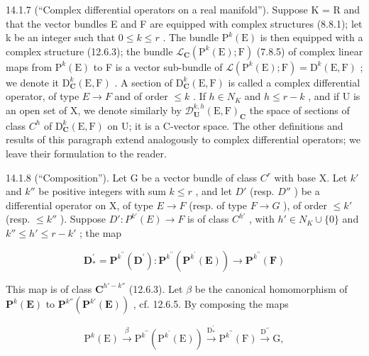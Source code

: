 14.1.7 (“Complex differential operators on a real manifold”). Suppose K = R and that the vector bundles E and F are equipped with complex structures (8.8.1); let k be an integer such that \(0 \leqslant k \leqslant r\) . The bundle \(\mathrm{P}^{k}(\mathrm{E})\) is then equipped with a complex structure (12.6.3); the bundle \(\mathcal{L}_{\mathbf{C}}(\mathrm{P}^{k}(\mathrm{E}); \mathrm{F})\) (7.8.5) of complex linear maps from \(\mathrm{P}^{k}(\mathrm{E})\) to F is a vector sub-bundle of \(\mathcal{L}(\mathrm{P}^{k}(\mathrm{E}); \mathrm{F}) = \mathrm{D}^{k}(\mathrm{E}, \mathrm{F})\) ; we denote it \(\mathrm{D}_{\mathbf{C}}^{k}(\mathrm{E}, \mathrm{F})\) . A section of \(\mathrm{D}_{\mathbf{C}}^{k}(\mathrm{E}, \mathrm{F})\) is called a complex differential operator, of type \(E \to F\) and of order \(\leqslant k\) . If \(h \in N_{K}\) and \(h \leqslant r - k\) , and if U is an open set of X, we denote similarly by \(\mathcal{D}_{\mathbf{U}}^{k,h}(\mathrm{E}, \mathrm{F})_{\mathbf{C}}\) the space of sections of class \(C^{h}\) of \(\mathrm{D}_{\mathbf{C}}^{k}(\mathrm{E}, \mathrm{F})\) on U; it is a C-vector space. The other definitions and results of this paragraph extend analogously to complex differential operators; we leave their formulation to the reader.

14.1.8 (“Composition”). Let G be a vector bundle of class \(C^{r}\) with base X. Let \(k'\) and \(k''\) be positive integers with sum \(k \leqslant r\) , and let \(D'\) (resp. \(D''\) ) be a differential operator on X, of type \(E \to F\) (resp. of type \(F \to G\) ), of order \(\leqslant k'\) (resp. \(\leqslant k''\) ). Suppose \(D': P^{k'}(E) \to F\) is of class \(C^{h'}\) , with \(h' \in N_{K} \cup \{0\}\) and \(k'' \leqslant h' \leqslant r - k'\) ; the map

\[
\mathbf {D} _ {*} ^ {\prime} = \mathbf {P} ^ {k ^ {\prime \prime}} (\mathbf {D} ^ {\prime}) \colon \mathbf {P} ^ {k ^ {\prime \prime}} (\mathbf {P} ^ {k ^ {\prime}} (\mathbf {E})) \rightarrow \mathbf {P} ^ {k ^ {\prime \prime}} (\mathbf {F})
\]

This map is of class \(\mathbf{C}^{h'-k''}\) (12.6.3). Let \(\beta\) be the canonical homomorphism of \(\mathbf{P}^{k}(\mathbf{E})\) to \(\mathbf{P}^{k''}(\mathbf{P}^{k'}(\mathbf{E}))\) , cf. 12.6.5. By composing the maps

\[
\mathrm{P} ^ {k} (\mathrm{E}) \xrightarrow {\beta} \mathrm{P} ^ {k ^ {\prime \prime}} (\mathrm{P} ^ {k ^ {\prime}} (\mathrm{E})) \xrightarrow {\mathrm{D} _ {*} ^ {\prime}} \mathrm{P} ^ {k ^ {\prime \prime}} (\mathrm{F}) \xrightarrow {\mathrm{D} ^ {\prime \prime}} \mathrm{G},
\]

